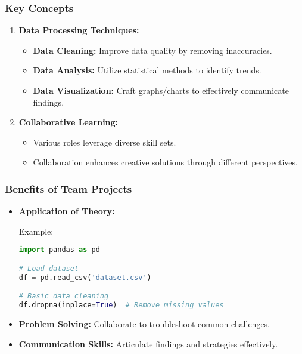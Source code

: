 \documentclass{beamer}
\begin{document}
\begin{frame}[fragile]
    \frametitle{Key Concepts}
    \begin{enumerate}
        \item \textbf{Data Processing Techniques:}
            \begin{itemize}
                \item \textbf{Data Cleaning:} Improve data quality by removing inaccuracies.
                \item \textbf{Data Analysis:} Utilize statistical methods to identify trends.
                \item \textbf{Data Visualization:} Craft graphs/charts to effectively communicate findings.
            \end{itemize}
        \item \textbf{Collaborative Learning:}
            \begin{itemize}
                \item Various roles leverage diverse skill sets.
                \item Collaboration enhances creative solutions through different perspectives.
            \end{itemize}
    \end{enumerate}
\end{frame}

\begin{frame}[fragile]
    \frametitle{Benefits of Team Projects}
    \begin{itemize}
        \item \textbf{Application of Theory:}
            \begin{block}{Example:}
                \begin{lstlisting}[language=Python]
import pandas as pd

# Load dataset
df = pd.read_csv('dataset.csv')

# Basic data cleaning
df.dropna(inplace=True)  # Remove missing values
                \end{lstlisting}
            \end{block}
        \item \textbf{Problem Solving:} Collaborate to troubleshoot common challenges.
        \item \textbf{Communication Skills:} Articulate findings and strategies effectively.
    \end{itemize}
\end{frame}
\end{document}
